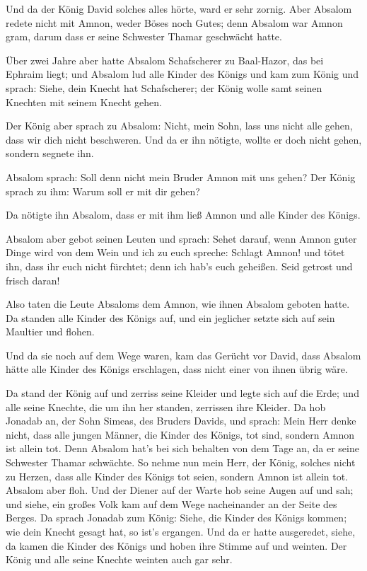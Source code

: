  Und da der König David solches alles hörte, ward er sehr
zornig. Aber Absalom redete nicht mit Amnon, weder Böses noch Gutes;
 denn Absalom war Amnon gram, darum dass er seine
Schwester Thamar geschwächt hatte.

 Über zwei Jahre aber hatte Absalom Schafscherer zu
Baal-Hazor, das bei Ephraim liegt; und Absalom lud alle Kinder des
Königs  und kam zum König und sprach: Siehe, dein Knecht
hat Schafscherer; der König wolle samt seinen Knechten mit seinem Knecht
gehen.

 Der König aber sprach zu Absalom: Nicht, mein Sohn, lass
uns nicht alle gehen, dass wir dich nicht beschweren. Und da er ihn
nötigte, wollte er doch nicht gehen, sondern segnete ihn.

 Absalom sprach: Soll denn nicht mein Bruder Amnon mit
uns gehen? Der König sprach zu ihm: Warum soll er mit dir gehen?

 Da nötigte ihn Absalom, dass er mit ihm ließ Amnon und
alle Kinder des Königs.

 Absalom aber gebot seinen Leuten und sprach: Sehet
darauf, wenn Amnon guter Dinge wird von dem Wein und ich zu euch
spreche: Schlagt Amnon! und tötet ihn, dass ihr euch nicht fürchtet;
denn ich hab's euch geheißen. Seid getrost und frisch daran!

 Also taten die Leute Absaloms dem Amnon, wie ihnen
Absalom geboten hatte. Da standen alle Kinder des Königs auf, und ein
jeglicher setzte sich auf sein Maultier und flohen.

 Und da sie noch auf dem Wege waren, kam das Gerücht vor
David, dass Absalom hätte alle Kinder des Königs erschlagen, dass nicht
einer von ihnen übrig wäre.

 Da stand der König auf und zerriss seine Kleider und
legte sich auf die Erde; und alle seine Knechte, die um ihn her standen,
zerrissen ihre Kleider.  Da hob Jonadab an, der Sohn
Simeas, des Bruders Davids, und sprach: Mein Herr denke nicht, dass alle
jungen Männer, die Kinder des Königs, tot sind, sondern Amnon ist allein
tot. Denn Absalom hat's bei sich behalten von dem Tage an, da er seine
Schwester Thamar schwächte.  So nehme nun mein Herr, der
König, solches nicht zu Herzen, dass alle Kinder des Königs tot seien,
sondern Amnon ist allein tot.  Absalom aber floh. Und der
Diener auf der Warte hob seine Augen auf und sah; und siehe, ein großes
Volk kam auf dem Wege nacheinander an der Seite des Berges.
 Da sprach Jonadab zum König: Siehe, die Kinder des
Königs kommen; wie dein Knecht gesagt hat, so ist's ergangen.
 Und da er hatte ausgeredet, siehe, da kamen die Kinder
des Königs und hoben ihre Stimme auf und weinten. Der König und alle
seine Knechte weinten auch gar sehr.

